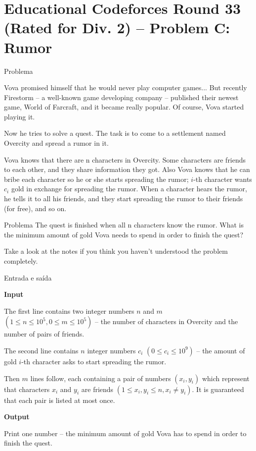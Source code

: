 \section{Educational Codeforces Round 33 (Rated for Div. 2) -- Problem C: Rumor}

\begin{frame}[fragile]{Problema}

Vova promised himself that he would never play computer games... But recently Firestorm -- a 
well-known game developing company -- published their newest game, World of Farcraft, and it became 
really popular. Of course, Vova started playing it.

Now he tries to solve a quest. The task is to come to a settlement named Overcity and spread a 
rumor in it.

Vova knows that there are n characters in Overcity. Some characters are friends to each other, and they share information they got. Also Vova knows that he can bribe each character so he or she starts spreading the rumor; $i$-th character wants $c_i$ gold in exchange for spreading the rumor. When a character hears the rumor, he tells it to all his friends, and they start spreading the rumor to their friends (for free), and so on.
\end{frame}


\begin{frame}[fragile]{Problema}
The quest is finished when all n characters know the rumor. What is the minimum amount of gold Vova needs to spend in order to finish the quest?

Take a look at the notes if you think you haven't understood the problem completely.

\end{frame}

\begin{frame}[fragile]{Entrada e saída}

\textbf{Input}

The first line contains two integer numbers $n$ and $m$ $(1\leq n\leq 10^5, 0\leq m\leq 10^5)$ -- 
the number of characters in Overcity and the number of pairs of friends.

The second line contains $n$ integer numbers $c_i$ $(0\leq c_i\leq 10^9)$ -- the amount of gold 
$i$-th character asks to start spreading the rumor.

Then $m$ lines follow, each containing a pair of numbers $(x_i, y_i)$ which represent that 
characters $x_i$ and $y_i$ are friends $(1\leq x_i, y_i\leq n, x_i\neq y_i)$. It is guaranteed 
that each pair is listed at most once.

\textbf{Output}

Print one number -- the minimum amount of gold Vova has to spend in order to finish the quest.

\end{frame}

